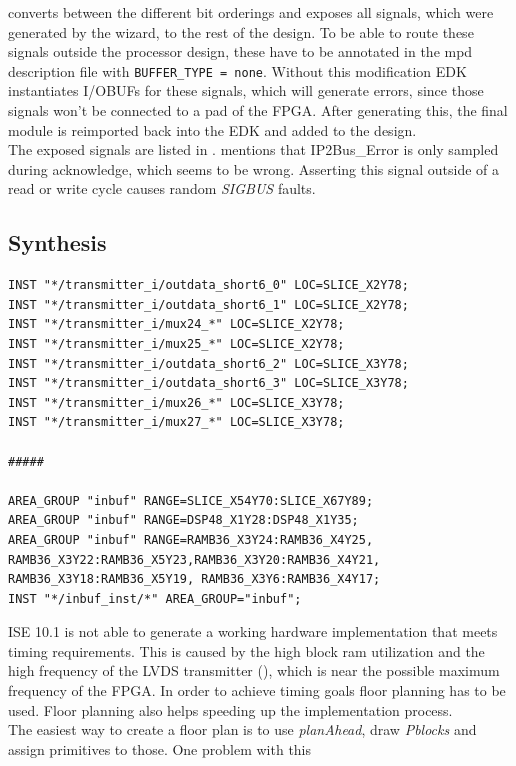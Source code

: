 \documentclass[11pt,technote,a4paper,onecolumn,dvips]{IEEEtran}
\newcommand{\signal}[1]{{\ttfamily #1}}
\begin{document}
converts between the different bit orderings and exposes all signals, which
were generated by the wizard, to the rest of the design. To be able to route
these signals outside the processor design, these have to be annotated in the
mpd description file with \verb+BUFFER_TYPE = none+. Without this modification
EDK instantiates I/OBUFs for these signals, which will generate errors,
since those signals won't be connected to a pad of the FPGA. After generating
this, the final module is reimported back into the EDK and added to the
design.\\
The exposed signals are listed in \cite{slave_burst}. \cite[p. 14]{slave_burst}
mentions that \signal{IP2Bus\_Error} is only sampled during acknowledge, which
seems to be wrong. Asserting this signal outside of a read or write cycle
causes random \emph{SIGBUS} faults.
\subsection{Synthesis}
\label{sec:synthesis}
\begin{lstlisting}[float,language=ucf,caption={Floor plan example},label=lst:floorplan]
INST "*/transmitter_i/outdata_short6_0" LOC=SLICE_X2Y78;
INST "*/transmitter_i/outdata_short6_1" LOC=SLICE_X2Y78;
INST "*/transmitter_i/mux24_*" LOC=SLICE_X2Y78;
INST "*/transmitter_i/mux25_*" LOC=SLICE_X2Y78;
INST "*/transmitter_i/outdata_short6_2" LOC=SLICE_X3Y78;
INST "*/transmitter_i/outdata_short6_3" LOC=SLICE_X3Y78;
INST "*/transmitter_i/mux26_*" LOC=SLICE_X3Y78;
INST "*/transmitter_i/mux27_*" LOC=SLICE_X3Y78;

#####

AREA_GROUP "inbuf" RANGE=SLICE_X54Y70:SLICE_X67Y89;
AREA_GROUP "inbuf" RANGE=DSP48_X1Y28:DSP48_X1Y35;
AREA_GROUP "inbuf" RANGE=RAMB36_X3Y24:RAMB36_X4Y25, RAMB36_X3Y22:RAMB36_X5Y23,RAMB36_X3Y20:RAMB36_X4Y21, RAMB36_X3Y18:RAMB36_X5Y19, RAMB36_X3Y6:RAMB36_X4Y17;
INST "*/inbuf_inst/*" AREA_GROUP="inbuf";
\end{lstlisting}
ISE 10.1 is not able to generate a working hardware implementation that
meets timing requirements. This is caused by the high block ram utilization
and the high frequency of the LVDS transmitter (), which is
near the possible maximum frequency of the FPGA. In order to achieve timing
goals floor planning has to be used. Floor planning also helps speeding up
the implementation process.\\
The easiest way to create a floor plan is to use \emph{planAhead}, draw
\emph{Pblocks} and assign primitives to those. One problem with this
\end{document}
